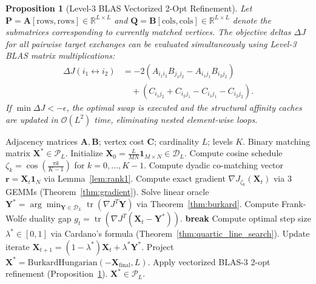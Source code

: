 \documentclass[a4paper,fleqn]{cas-dc}
\theoremstyle{thmstyleone}
\newtheorem{proposition}[theorem]{Proposition}
\theoremstyle{thmstyletwo}
\theoremstyle{thmstylethree}
\begin{document}
\begin{proposition}[Level-3 BLAS Vectorized 2-Opt Refinement]
\label{prop:2opt}
Let $\mathbf{P} = \mathbf{A}[\mathrm{rows}, \mathrm{rows}] \in \mathbb{R}^{L \times L}$ and $\mathbf{Q} = \mathbf{B}[\mathrm{cols}, \mathrm{cols}] \in \mathbb{R}^{L \times L}$ denote the submatrices corresponding to currently matched vertices. The objective deltas $\Delta J$ for all pairwise target exchanges can be evaluated simultaneously using Level-3 BLAS matrix multiplications:
\begin{align}
\Delta J(i_1 \leftrightarrow i_2) &= -2 \left( A_{i_1 i_2} B_{j_1 j_2} - A_{i_1 j_1} B_{i_2 j_2} \right) \nonumber \\
&\quad + (C_{i_1 j_2} + C_{i_2 j_1} - C_{i_1 j_1} - C_{i_2 j_2}).
\label{eq:2opt}
\end{align}
If $\min \Delta J < -\epsilon$, the optimal swap is executed and the structural affinity caches are updated in $\mathcal{O}(L^2)$ time, eliminating nested element-wise loops.
\end{proposition}

\begin{algorithm}[!t]
\caption{Fast-WCS Analytical Optimization Framework}
\label{alg:fast_wcs}
\begin{algorithmic}[1]\small
\REQUIRE Adjacency matrices $\mathbf{A}, \mathbf{B}$; vertex cost $\mathbf{C}$; cardinality $L$; levels $K$.
\ENSURE Binary matching matrix $\mathbf{X}^* \in \mathcal{P}_L$.
\STATE Initialize $\mathbf{X}_0 = \frac{L}{M N} \mathbf{1}_{M \times N} \in \mathcal{D}_L$.
\STATE Compute cosine schedule $\zeta_k = \cos\left( \frac{\pi k}{K-1} \right)$ for $k = 0, \dots, K-1$.
    \REPEAT
        \STATE Compute dyadic co-matching vector $\mathbf{r} = \mathbf{X}_t \mathbf{1}_N$ via Lemma~\ref{lem:rank1}.
        \STATE Compute exact gradient $\nabla J_{\zeta_k}(\mathbf{X}_t)$ via 3 GEMMs (Theorem~\ref{thm:gradient}).
        \STATE Solve linear oracle $\mathbf{Y}^* = \arg\min_{\mathbf{Y} \in \mathcal{D}_L} \operatorname{tr}(\nabla J^T \mathbf{Y})$ via Theorem~\ref{thm:burkard}.
        \STATE Compute Frank-Wolfe duality gap $g_t = \operatorname{tr}(\nabla J^T(\mathbf{X}_t - \mathbf{Y}^*))$.
            \STATE \textbf{break}
        \ENDIF
        \STATE Compute optimal step size $\lambda^* \in [0, 1]$ via Cardano's formula (Theorem~\ref{thm:quartic_line_search}).
        \STATE Update iterate $\mathbf{X}_{t+1} = (1 - \lambda^*)\mathbf{X}_t + \lambda^*\mathbf{Y}^*$.
\ENDFOR
\STATE Project $\mathbf{X}^* = \text{BurkardHungarian}(-\mathbf{X}_{\text{final}}, L)$.
\STATE Apply vectorized BLAS-3 2-opt refinement (Proposition~\ref{prop:2opt}).
\RETURN $\mathbf{X}^* \in \mathcal{P}_L$.
\end{algorithmic}
\end{algorithm}
\end{document}

